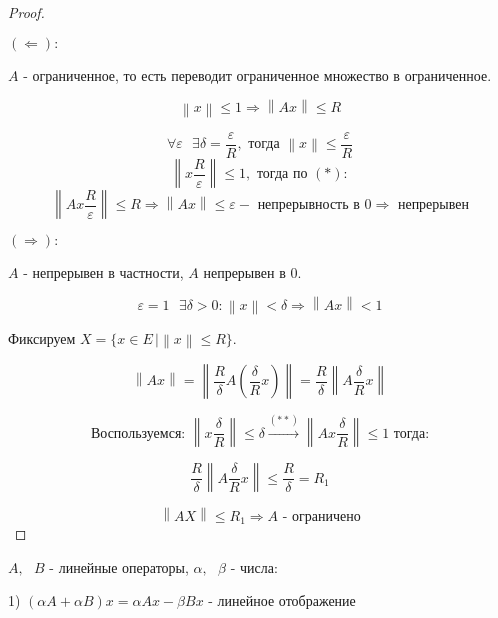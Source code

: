 \documentclass[12pt, a4paper]{report}
\begin{document}
\begin{proof} \(  \) 

\begin{flushleft}
    \( (\Leftarrow ):  \) 
\end{flushleft}

\( A  \) - ограниченное, то есть переводит ограниченное множество в ограниченное. 

\[ \left\lVert  x  \right\rVert \le 1 \Rightarrow \left\lVert Ax  \right\rVert \le R  \tag{\(* \) }\] 

\[ \forall  \varepsilon \text{ }  \exists \delta =  \frac{\varepsilon}{R } , \text{  тогда  } \left\lVert x  \right\rVert \le \frac{\varepsilon}{R}   \] 
\[ \left\lVert  x \frac{R}{\varepsilon }  \right\rVert \le 1 , \text{ тогда по } (* ) :    \] 
\[ \left\lVert A x \frac{R}{\varepsilon }  \right\rVert  \le R \Rightarrow  \left\lVert Ax  \right\rVert \le \varepsilon - \text{ непрерывность в } 0 \Rightarrow \text{ непрерывен}  \] 

\begin{flushleft}
    \( (\Rightarrow ):  \) 
\end{flushleft}

\( A  \) - непрерывен в частности, \( A  \) непрерывен в 0. 

\[ \varepsilon = 1\text{ } \exists  \delta > 0 : \left\lVert  x  \right\rVert< \delta \Rightarrow \left\lVert  Ax  \right\rVert < 1 \tag{\( ** \)}   \] 

Фиксируем \( X = \{ x \in  E \, | \left\lVert  x  \right\rVert  \le R \} \). 

\[ \left\lVert  A x  \right\rVert = \left\lVert  \frac{R}{ \delta }  A \left(  \frac{\delta}{R }  x  \right)  \right\rVert = \frac{R}{\delta } \left\lVert  A \frac{\delta}{R }  x  \right\rVert   \] 

\[ \text{ Воспользуемся: } \left\lVert  x \frac{ \delta }{R }  \right\rVert \le \delta \xrightarrow { (** )} \left\lVert  A x \frac{ \delta }{R }  \right\rVert \le 1 \text{ тогда: }   \] 

\[ \frac{R}{\delta } \left\lVert  A \frac{\delta}{R }  x  \right\rVert  \le \frac{R}{\delta } = R_1   \] 

\[ \left\lVert  AX  \right\rVert \le R_1 \Rightarrow A \text{ - ограничено}  \] 
\end{proof}

\( A , \text{ }  B  \) - линейные операторы, \( \alpha , \text{ }  \beta  \) - числа: 

1) \( (\alpha A + \alpha B ) x = \alpha A x - \beta B x \text{ - линейное отображение}  \) 
\end{document}
